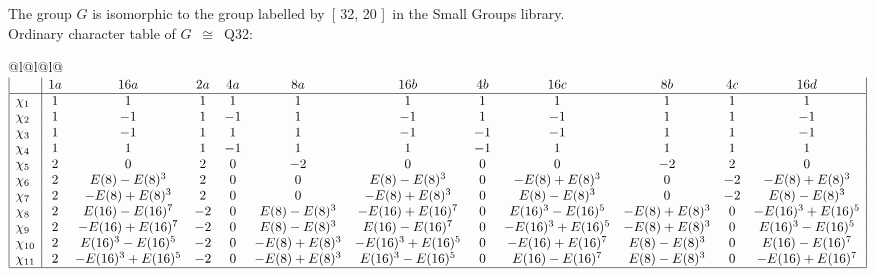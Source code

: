 \documentclass[varwidth=\maxdimen,border=10]{standalone}
\begin{document}
The group $G$ is isomorphic to the group labelled by\ [ 32, 20 ]\ in the Small Groups library.\\
Ordinary character table of $G$\ $\cong$\ Q32:\\
\begin{center}
\begin{tabular}{@{}l@{}l@{}l@{}}
\hline
\(\begin{array}{|l|ccccccccccc|}
  & 1a & 16a & 2a & 4a & 8a & 16b & 4b & 16c & 8b & 4c & 16d\\ \hline
\chi_{1} & 1 & 1 & 1 & 1 & 1 & 1 & 1 & 1 & 1 & 1 & 1\\
\chi_{2} & 1 & -1 & 1 & -1 & 1 & -1 & 1 & -1 & 1 & 1 & -1\\
\chi_{3} & 1 & -1 & 1 & 1 & 1 & -1 & -1 & -1 & 1 & 1 & -1\\
\chi_{4} & 1 & 1 & 1 & -1 & 1 & 1 & -1 & 1 & 1 & 1 & 1\\
\chi_{5} & 2 & 0 & 2 & 0 & -2 & 0 & 0 & 0 & -2 & 2 & 0\\
\chi_{6} & 2 & E(8)-E(8)^{3} & 2 & 0 & 0 & E(8)-E(8)^{3} & 0 & -E(8)+E(8)^{3} & 0 & -2 & -E(8)+E(8)^{3}\\
\chi_{7} & 2 & -E(8)+E(8)^{3} & 2 & 0 & 0 & -E(8)+E(8)^{3} & 0 & E(8)-E(8)^{3} & 0 & -2 & E(8)-E(8)^{3}\\
\chi_{8} & 2 & E(16)-E(16)^{7} & -2 & 0 & E(8)-E(8)^{3} & -E(16)+E(16)^{7} & 0 & E(16)^{3}-E(16)^{5} & -E(8)+E(8)^{3} & 0 & -E(16)^{3}+E(16)^{5}\\
\chi_{9} & 2 & -E(16)+E(16)^{7} & -2 & 0 & E(8)-E(8)^{3} & E(16)-E(16)^{7} & 0 & -E(16)^{3}+E(16)^{5} & -E(8)+E(8)^{3} & 0 & E(16)^{3}-E(16)^{5}\\
\chi_{10} & 2 & E(16)^{3}-E(16)^{5} & -2 & 0 & -E(8)+E(8)^{3} & -E(16)^{3}+E(16)^{5} & 0 & -E(16)+E(16)^{7} & E(8)-E(8)^{3} & 0 & E(16)-E(16)^{7}\\
\chi_{11} & 2 & -E(16)^{3}+E(16)^{5} & -2 & 0 & -E(8)+E(8)^{3} & E(16)^{3}-E(16)^{5} & 0 & E(16)-E(16)^{7} & E(8)-E(8)^{3} & 0 & -E(16)+E(16)^{7}\\
\hline
\end{array}\)\\
\end{tabular}
\end{center}
\end{document}
